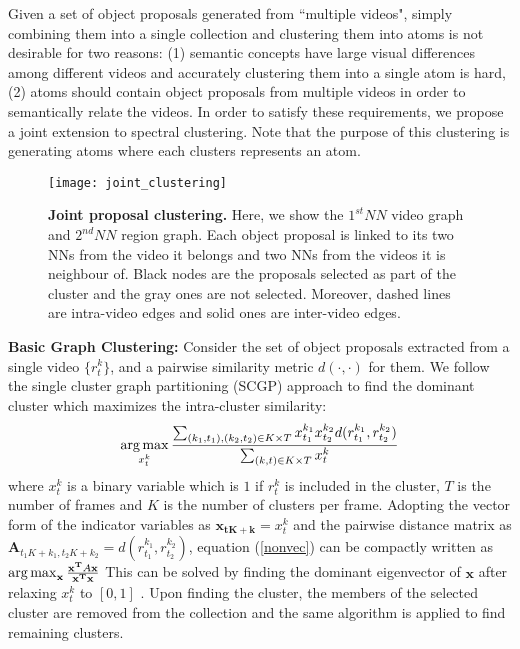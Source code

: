 Given a set of object proposals generated from ``multiple videos", simply combining them into a single collection and clustering them into atoms is not desirable for two reasons: (1) semantic concepts have large visual differences among different videos and accurately clustering them into a single atom is hard, (2) atoms should contain object proposals from multiple videos in order to semantically relate the videos. In order to satisfy these requirements, we propose a joint extension to spectral clustering. Note that the purpose of this clustering is generating atoms where each clusters represents an atom.

\begin{figure}[ht]
  \texttt{[image: joint\_clustering]}
  \vskip -2mm
\caption{\textbf{Joint proposal clustering.} Here, we show the $1^{st}NN$ video graph and $2^{nd}NN$ region graph. Each object proposal is linked to its two NNs from the video it belongs and two NNs from the videos it is neighbour of. Black nodes are the proposals selected as part of the cluster and the gray ones are not selected. Moreover, dashed lines are intra-video edges and solid ones are inter-video edges.}
  \label{hierProposal}
    \vskip -1mm
\end{figure}

\noindent\textbf{Basic Graph Clustering:} Consider the set of object proposals extracted from a single video $\{r^k_t\}$, and a pairwise similarity metric $d(\cdot,\cdot)$ for them. We follow the single cluster graph partitioning (SCGP)\cite{scgp} approach to find the dominant cluster which maximizes the intra-cluster similarity:
\begin{equation}
  \argmax_{x^k_t} \frac{\sum_{(k_1,t_1),(k_2,t_2) \in K \times T} x^{k_1}_{t_1} x^{k_2}_{t_2} d(r^{k_1}_{t_1},r^{k_2}_{t_2})}{\sum_{(k,t) \in K \times T} x^{k}_t}
  \label{nonvec}
\end{equation}
where $x^{k}_t$ is a binary variable which is $1$ if $r^{k}_t$ is included in the cluster, $T$ is the number of frames and $K$ is the number of clusters per frame. Adopting the vector form of the indicator variables as $\mathbf{x_{tK+k}}=x^{k}_{t}$ and the pairwise distance matrix as $\mathbf{A}_{t_1K+k_1,t_2K+k_2}=d(r^{k_1}_{t_1},r^{k_2}_{t_2})$, equation (\ref{nonvec}) can be compactly written as
$\operatorname*{arg\,max}_{\mathbf{x}} \frac{\mathbf{x^T}A\mathbf{x}}{\mathbf{x^T}\mathbf{x}}$
This can be solved by finding the dominant eigenvector of $\mathbf{x}$ after relaxing $x^{k}_t$ to $[0,1]$ \cite{scgp,scgp_eigen}. Upon finding the cluster, the members of the selected cluster are removed from the collection and the same algorithm is applied to find remaining clusters.

